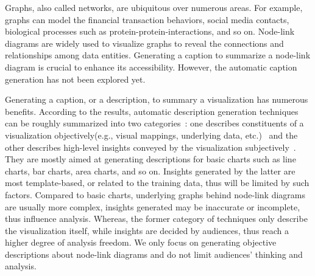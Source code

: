 \maketitle

Graphs, also called networks, are ubiquitous over numerous areas. For example, graphs can model the financial transaction behaviors, social media contacts, biological processes such as protein-protein-interactions, and so on.
Node-link diagrams are widely used to visualize graphs to reveal the connections and relationships among data entities.
Generating a caption to summarize a node-link diagram is crucial to enhance its accessibility.
However, the automatic caption generation has not been explored yet.

Generating a caption, or a description, to summary a visualization has numerous benefits.
According to the results, automatic description generation techniques can be roughly summarized into two categories~\cite{DBLP:conf/inlg/ObeidH20}: one describes constituents of a visualization objectively(e.g., visual mappings, underlying data, etc.)~\cite{DBLP:journals/coling/MittalMCR98, DBLP:journals/tochi/FerresLST13} and the other describes high-level insights conveyed by the visualization subjectively~\cite{DBLP:conf/apvis/LiuXHWY20, DBLP:conf/inlg/ObeidH20}.
They are mostly aimed at generating descriptions for basic charts such as line charts, bar charts, area charts, and so on.
Insights generated by the latter are most template-based, or related to the training data, thus will be limited by such factors.
Compared to basic charts, underlying graphs behind node-link diagrams are usually more complex, 
insights generated may be inaccurate or incomplete, thus influence analysis.
Whereas, the former category of techniques only describe the visualization itself, while insights are decided by audiences, thus reach a higher degree of analysis freedom.
We only focus on generating objective descriptions about node-link diagrams and do not limit audiences' thinking and analysis.



